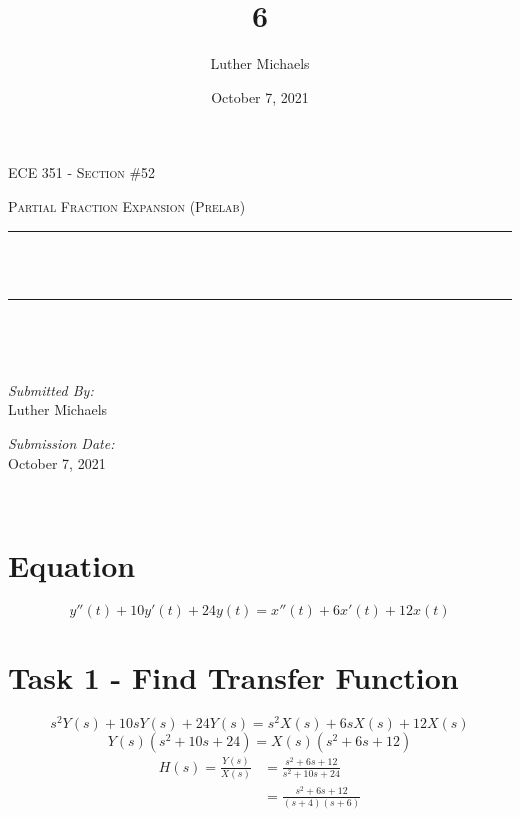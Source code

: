 \documentclass[12pt]{report}
\title{6}	%
\author{Luther Michaels}	%
\date{October 7, 2021}   %
\makeatletter
\let\thetitle\@title
\makeatother
\begin{document}
	
\begin{titlepage}
	\centering
	\vspace*{0.5 cm}
		
	\begin{center}    
		\textsc{\Large   ECE 351 - Section \#52}\\[2.0 cm]	
	\end{center}  
	\textsc{\Large Partial Fraction Expansion (Prelab)  }\\[0.5 cm]
	\rule{\linewidth}{0.2 mm} \\[0.4 cm]
	{ \huge \bfseries \thetitle}\\
	\rule{\linewidth}{0.2 mm} \\[1.5 cm]
	\begin{minipage}{0.4\textwidth}
		\begin{flushleft} \large
		\end{flushleft}
	\end{minipage}~
	\begin{minipage}{0.4\textwidth}
		\begin{flushright} \large
			\emph{Submitted By:} \\
			Luther Michaels \break
			
			\emph{Submission Date:} \\
			October 7, 2021
		\end{flushright}
	\end{minipage}\\[2 cm]
\end{titlepage}

\renewcommand{\thesection}{\arabic{section}}
	
\section{Equation}
	
\begin{equation*}
	y''(t) + 10y'(t) + 24y(t) = x''(t) + 6x'(t) + 12x(t)
\end{equation*}
	
\section{Task 1 - Find Transfer Function}

\begin{equation*}
	s^2Y(s) + 10sY(s) + 24Y(s) = s^2X(s) + 6sX(s) + 12X(s)
\end{equation*}
\begin{equation*}
	Y(s)(s^2 + 10s + 24) = X(s)(s^2 + 6s + 12)
\end{equation*}
\begin{align*}
	H(s) = \frac{Y(s)}{X(s)} &= \frac{s^2 + 6s + 12}{s^2 + 10s + 24} \\
	&= \frac{s^2 + 6s + 12}{(s + 4)(s + 6)}
\end{align*}
	
\end{document}

